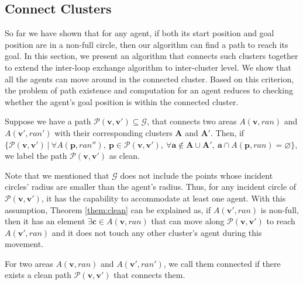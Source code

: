 \subsection{Connect Clusters}
So far we have shown that for any agent, if both its start position and goal position are in a non-full circle, then our algorithm can find a path to reach its goal. 
In this section, we present an algorithm that connects such clusters together to extend the inter-loop exchange algorithm to  inter-cluster level.
We show that all the agents can move around in the connected cluster. Based on this criterion, the problem of path existence and computation for an agent reduces to checking whether the agent's goal position is within the connected cluster.


\begin{theorem}
Suppose we have a path $\mathcal{P}\mathbf{(v, v')} \subseteq \mathcal{G}$, that connects two areas $A(\mathbf v,ran)$ and $A(\mathbf v',ran')$ with their corresponding clusters $\mathbf{A}$ and $\mathbf{A'}$.
Then, if $\{\mathcal{P}\mathbf{(v, v')}\ |\ \forall A(\mathbf p,ran''),\ \mathbf{p} \in \mathcal{P}\mathbf{(v, v')},\ \forall \mathbf{a} \notin \mathbf{A} \cup \mathbf{A'},\ \mathbf{a} \cap A(\mathbf p,ran) = \varnothing\}$, we label the path $\mathcal{P}\mathbf{(v, v')}$ as clean.
\label{them:clean}
\end{theorem}

Note that we mentioned that $\mathcal{G}$ does not include the points whose incident circles' radius are smaller than the agent's radius. Thus, for any incident circle of $\mathcal{P}\mathbf{(v, v')}$, it has the capability to accommodate at least one agent. 
With this assumption, Theorem \ref{them:clean} can be explained as, if $A(\mathbf v', ran)$ is non-full, then it has an element $ \exists \mathbf{c} \in A(\mathbf v,ran)$ that can move along $\mathcal{P}\mathbf{(v, v')}$ to reach $A(\mathbf v', ran)$ and it does not touch any other cluster's agent during this movement. 

\begin{definition}
For two areas $A(\mathbf v, ran)$ and $ A(\mathbf v', ran')$, we call them connected if there exists a clean path $\mathcal{P(\mathbf v,\mathbf v')}$ that connects them. 
\label{def:connect}
\end{definition}


